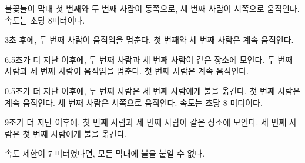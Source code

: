 \begin{problem}{불꽃놀이 막대}
	첫 번째와 두 번째 사람이 동쪽으로, 세 번째 사람이 서쪽으로 움직인다. 속도는 초당 8미터이다.
	
	3초 후에, 두 번째 사람이 움직임을 멈춘다. 첫 번째와 세 번째 사람은 계속 움직인다.
	
	6.5초가 더 지난 이후에, 두 번째 사람과 세 번째 사람이 같은 장소에 모인다. 두 번째 사람과 세 번째 사람이 움직임을 멈춘다. 첫 번째 사람은 계속 움직인다.
	
	0.5초가 더 지난 이후에, 두 번째 사람은 세 번째 사람에게 불을 옮긴다. 첫 번째 사람은 계속 움직인다. 세 번째 사람은 서쪽으로 움직인다. 속도는 초당 8 미터이다.
	
	9초가 더 지난 이후에, 첫 번째 사람과 세 번째 사람이 같은 장소에 모인다. 세 번째 사람은 첫 번째 사람에게 불을 옮긴다.
		
	속도 제한이 7 미터였다면, 모든 막대에 불을 붙일 수 없다.
	
	\begin{example}
	\end{example}
	
	
\end{problem}

